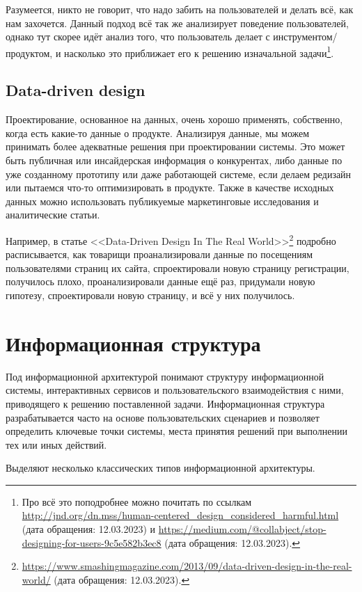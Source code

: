 \documentclass{../../text-style}
\begin{document}
Разумеется, никто не говорит, что надо забить на пользователей и делать всё, как нам захочется. Данный подход всё так же анализирует поведение пользователей, однако тут скорее идёт анализ того, что пользователь делает с инструментом/продуктом, и насколько это приближает его к решению изначальной задачи\footnote{Про всё это поподробнее можно почитать по ссылкам \url{http://jnd.org/dn.mss/human-centered_design_considered_harmful.html} (дата обращения: 12.03.2023) и \url{https://medium.com/@collabject/stop-designing-for-users-9c5e582b3ec8} (дата обращения: 12.03.2023).}.

\subsection{Data-driven design}

Проектирование, основанное на данных, очень хорошо применять, собственно, когда есть какие-то данные о продукте. Анализируя данные, мы можем принимать более адекватные решения при проектировании системы. Это может быть публичная или инсайдерская информация о конкурентах, либо данные по уже созданному прототипу или даже работающей системе, если делаем редизайн или пытаемся что-то оптимизировать в продукте. Также в качестве исходных данных можно использовать публикуемые маркетинговые исследования и аналитические статьи.

Например, в статье <<Data-Driven Design In The Real World>>\footnote{\url{https://www.smashingmagazine.com/2013/09/data-driven-design-in-the-real-world/} (дата обращения: 12.03.2023).} подробно расписывается, как товарищи проанализировали данные по посещениям пользователями страниц их сайта, спроектировали новую страницу регистрации, получилось плохо, проанализировали данные ещё раз, придумали новую гипотезу, спроектировали новую страницу, и всё у них получилось.

\section{Информационная структура}

Под информационной архитектурой понимают структуру информационной системы, интерактивных сервисов и пользовательского взаимодействия с ними, приводящего к решению поставленной задачи. Информационная структура разрабатывается часто на основе пользовательских сценариев и позволяет определить ключевые точки системы, места принятия решений при выполнении тех или иных действий.

Выделяют несколько классических типов информационной архитектуры.
\end{document}
